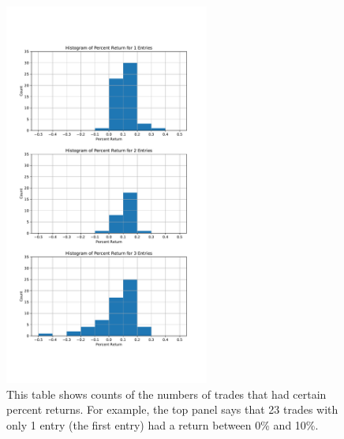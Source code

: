 \documentclass{article}
\begin{document}
	
	\begin{figure}
	
	\includegraphics[width=0.6\textwidth]{prog_entry_lim3_exit4_hist_by_entry.pdf}
	\caption{This table shows counts of the numbers of trades that had certain percent returns. For example, the top panel says that 23 trades with only 1 entry (the first entry) had a return between 0\% and 10\%.}
	\label{hist_by_entry_strat_exit4}
	\end{figure}
	
\end{document}
